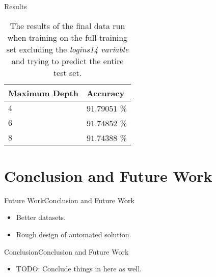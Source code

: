 \documentclass[12pt,aspectratio=1610]{beamer}
\newcommand{\graphicc}[4]{\begin{figure}[H] \centering
            \texttt{[image: \{\#2]}}
            \caption{{#3}} \label{#4} \end{figure}}
\begin{document}

\begin{frame}{Results}
	\begin{table}[H]
	  \centering
	  \begin{tabular}{l|l}
	    \textbf{Maximum Depth} & \textbf{Accuracy} \\ \hline
	    $4$                    & $91.79051$ \%     \\
	    $6$                    & $91.74852$ \%     \\
	    $8$                    & $91.74388$ \%
	  \end{tabular}
	  \caption{The results of the final data run when training on the full training
	    set excluding the \textit{logins14 variable} and trying to predict the
	    entire test set.}
	  \label{tab:results01}
	\end{table}
\end{frame}


\section{Conclusion and Future Work}

\begin{frame}{Future Work}{Conclusion and Future Work}
	\begin{itemize}
		\item Better datasets.
		\item Rough design of automated solution.
	\end{itemize}
\end{frame}

\begin{frame}{Conclusion}{Conclusion and Future Work}
	\begin{itemize}
		\item TODO: Conclude things in here as well.
	\end{itemize}
\end{frame}
\end{document}
